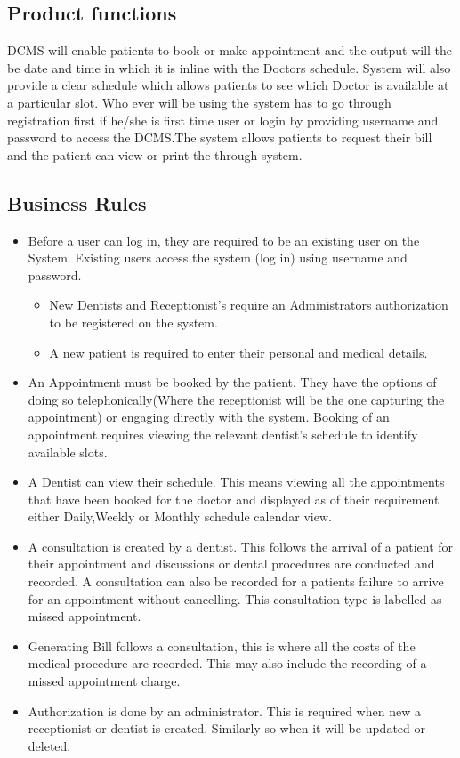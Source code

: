 \documentclass[11 pt]{article}
\begin{document}
    \subsection{Product functions}
DCMS will enable patients to book or make appointment and the output will the be date and time in which it is inline with the Doctors schedule. System will
    also provide a clear schedule which allows patients to see
    which Doctor is available at a particular slot. Who ever
    will be using the system has to go through registration
    first if he/she is first time user or login by providing
    username and password to access the DCMS.The system allows patients to request their bill and the patient can view or print the through system.
\subsection{Business Rules}
    \begin{itemize}
    \item
    Before a user can log in, they are required to be an existing user on the System. Existing users access the system (log in) using username and password.
    \begin{itemize}
    \item
    New Dentists and Receptionist's require an Administrators authorization to be registered on the system.
    \item
    A new patient is required to enter their personal and medical details.
    \end{itemize}
    \item
    An Appointment must be booked by the patient. They have the options of doing so telephonically(Where the receptionist will be the one capturing the appointment) or engaging directly with the system. Booking of an appointment requires viewing the relevant dentist's schedule to identify available slots.
    \item
    A Dentist can view their schedule. This means viewing all the appointments that have been booked for the doctor and displayed as of their requirement either Daily,Weekly or Monthly schedule calendar view.
    \item
    A consultation is created by a dentist. This follows the arrival of a patient for their appointment and discussions or dental procedures are conducted and recorded. A consultation can also be recorded for a patients failure to arrive for an appointment without cancelling. This consultation type is labelled as missed appointment.
    \item
    Generating Bill follows a consultation, this is where all the costs of the medical procedure are recorded. This may also include the recording of a missed appointment charge.
    \item
    Authorization is done by an administrator. This is required when new a receptionist or dentist is created. Similarly so when it will be updated or deleted.
    \end{itemize}
    
\end{document}
